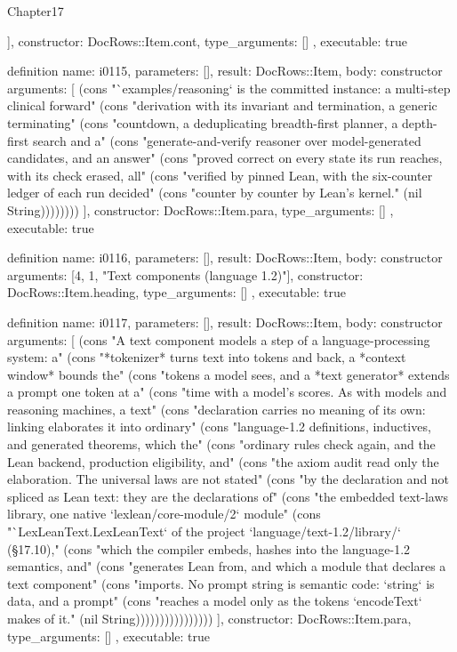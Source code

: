 \begin{lexlean}{Chapter17}
\begin{semanticmodule}
{{    ],
    constructor: DocRows::Item.cont,
    type_arguments: []
  },
  executable: true
}

definition{
  name: i0115,
  parameters: [],
  result: DocRows::Item,
  body: constructor{
    arguments: [
      (cons "`examples/reasoning` is the committed instance: a multi-step clinical forward" (cons "derivation with its invariant and termination, a generic terminating" (cons "countdown, a deduplicating breadth-first planner, a depth-first search and a" (cons "generate-and-verify reasoner over model-generated candidates, and an answer" (cons "proved correct on every state its run reaches, with its check erased, all" (cons "verified by pinned Lean, with the six-counter ledger of each run decided" (cons "counter by counter by Lean's kernel." (nil String))))))))
    ],
    constructor: DocRows::Item.para,
    type_arguments: []
  },
  executable: true
}

definition{
  name: i0116,
  parameters: [],
  result: DocRows::Item,
  body: constructor{
    arguments: [4, 1, "Text components (language 1.2)"],
    constructor: DocRows::Item.heading,
    type_arguments: []
  },
  executable: true
}

definition{
  name: i0117,
  parameters: [],
  result: DocRows::Item,
  body: constructor{
    arguments: [
      (cons "A text component models a step of a language-processing system: a" (cons "*tokenizer* turns text into tokens and back, a *context window* bounds the" (cons "tokens a model sees, and a *text generator* extends a prompt one token at a" (cons "time with a model's scores. As with models and reasoning machines, a text" (cons "declaration carries no meaning of its own: linking elaborates it into ordinary" (cons "language-1.2 definitions, inductives, and generated theorems, which the" (cons "ordinary rules check again, and the Lean backend, production eligibility, and" (cons "the axiom audit read only the elaboration. The universal laws are not stated" (cons "by the declaration and not spliced as Lean text: they are the declarations of" (cons "the embedded text-laws library, one native `lexlean/core-module/2` module" (cons "`LexLeanText.LexLeanText` of the project `language/text-1.2/library/` (§17.10)," (cons "which the compiler embeds, hashes into the language-1.2 semantics, and" (cons "generates Lean from, and which a module that declares a text component" (cons "imports. No prompt string is semantic code: `string` is data, and a prompt" (cons "reaches a model only as the tokens `encodeText` makes of it." (nil String))))))))))))))))
    ],
    constructor: DocRows::Item.para,
    type_arguments: []
  },
  executable: true
}


\end{semanticmodule}
\end{lexlean}
